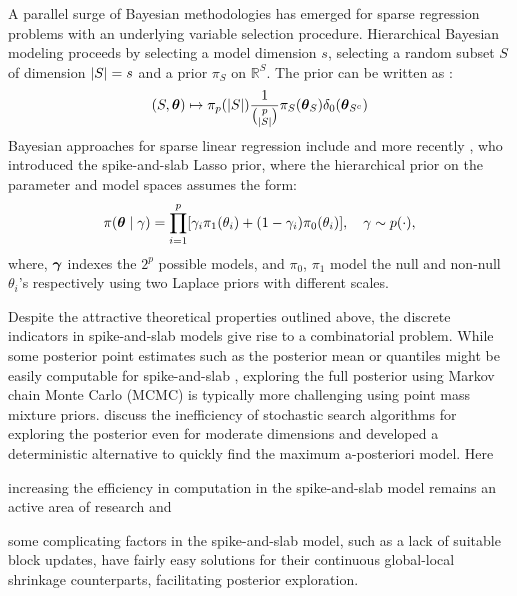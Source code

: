 \documentclass[11pt]{article}
\begin{document}
A parallel surge of Bayesian methodologies has emerged for sparse regression problems with an underlying variable selection procedure. Hierarchical Bayesian
modeling proceeds by selecting a model dimension $s$, selecting a random subset $S$ of dimension $\lvert S\rvert = s$ and a prior $\pi_S$ on $\mathbb{R}^{S}$. The
prior can be written as \cite{castillo2015bayesian}:
\begin{equation}
  (S,\boldsymbol{\theta}) \mapsto \pi_p(\lvert S\rvert) \frac{1}{\binom{p}{\lvert S\rvert}}
  \pi_S(\boldsymbol{\theta}_S)\delta_{0}(\boldsymbol{\theta}_{S^c}) \label{eq:bayes-hier}
\end{equation}
Bayesian approaches for sparse linear regression include \citep{george2000variable, George0000, mitchell88, ishwaran2005spike} and more
recently \cite{rovckova2016spike}, who introduced the spike-and-slab Lasso prior, where the hierarchical prior on the parameter and model spaces assumes
the form:
\begin{equation}
  \pi(\boldsymbol{\theta} \mid \gamma) = \prod_{i=1}^{p} [\gamma_i \pi_1(\theta_i) +
  (1-\gamma_i) \pi_0(\theta_i)], \quad \gamma \sim p(\cdot), \label{eq:ssl}
\end{equation}
where, $\boldsymbol{\gamma}$ indexes the $2^p$ possible models, and $\pi_0$, $\pi_1$ model the null and non-null $\theta_i$'s respectively using two Laplace priors with
different scales. 

Despite the attractive theoretical properties outlined above, the discrete indicators in spike-and-slab models give rise to a combinatorial problem. While
some posterior point estimates such as the posterior mean or quantiles might be easily computable for spike-and-slab \citep{castillo2012needles,
castillo2015bayesian}, exploring the full posterior using Markov chain Monte Carlo (MCMC) is typically more challenging using point mass mixture priors. 
\citet{rovckova2016spike} discuss the inefficiency of stochastic search algorithms for exploring the posterior even for moderate dimensions and developed a deterministic alternative to quickly find the maximum a-posteriori model. Here 
\begin{enumerate*}
  \item increasing the efficiency in computation in the spike-and-slab model
    remains an active area of research \citep[see, e.g., ][]{rovckova2016spike}
    and
  \item some complicating factors in the spike-and-slab model, such as a lack of suitable block updates, have fairly easy solutions for their continuous
    global-local shrinkage counterparts, facilitating posterior exploration. 
\end{enumerate*}
\end{document}

